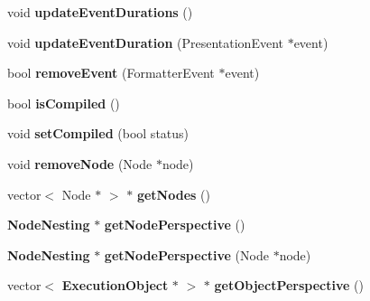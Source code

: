 \begin{CompactItemize}
\item 
void \textbf{updateEventDurations} ()\label{classbr_1_1pucrio_1_1telemidia_1_1ginga_1_1ncl_1_1model_1_1components_1_1ExecutionObject_980cded88f67c552b4515b843b7215be}

\item 
void \textbf{updateEventDuration} (PresentationEvent $\ast$event)\label{classbr_1_1pucrio_1_1telemidia_1_1ginga_1_1ncl_1_1model_1_1components_1_1ExecutionObject_462285fcb61d6a4a79e2f6aeb7413a03}

\item 
bool \textbf{removeEvent} (FormatterEvent $\ast$event)\label{classbr_1_1pucrio_1_1telemidia_1_1ginga_1_1ncl_1_1model_1_1components_1_1ExecutionObject_25223696062ad1dab0c16602db93ac36}

\item 
bool \textbf{isCompiled} ()\label{classbr_1_1pucrio_1_1telemidia_1_1ginga_1_1ncl_1_1model_1_1components_1_1ExecutionObject_bd83d4eca6a60ddc5247e741999c288c}

\item 
void \textbf{setCompiled} (bool status)\label{classbr_1_1pucrio_1_1telemidia_1_1ginga_1_1ncl_1_1model_1_1components_1_1ExecutionObject_607deb200bf05f866ec6fa1d8c21eb3a}

\item 
void \textbf{removeNode} (Node $\ast$node)\label{classbr_1_1pucrio_1_1telemidia_1_1ginga_1_1ncl_1_1model_1_1components_1_1ExecutionObject_f7aa3baee8dcea8617fdc160af52f9cb}

\item 
vector$<$ Node $\ast$ $>$ $\ast$ \textbf{getNodes} ()\label{classbr_1_1pucrio_1_1telemidia_1_1ginga_1_1ncl_1_1model_1_1components_1_1ExecutionObject_45badbe8d5784e8502b16d09ee61b884}

\item 
{\bf NodeNesting} $\ast$ \textbf{getNodePerspective} ()\label{classbr_1_1pucrio_1_1telemidia_1_1ginga_1_1ncl_1_1model_1_1components_1_1ExecutionObject_40612d8e8da3cb166af2762423e3235c}

\item 
{\bf NodeNesting} $\ast$ \textbf{getNodePerspective} (Node $\ast$node)\label{classbr_1_1pucrio_1_1telemidia_1_1ginga_1_1ncl_1_1model_1_1components_1_1ExecutionObject_8d3917403d7d9849e8ae5c1230a34bf8}

\item 
vector$<$ {\bf ExecutionObject} $\ast$ $>$ $\ast$ \textbf{getObjectPerspective} ()\label{classbr_1_1pucrio_1_1telemidia_1_1ginga_1_1ncl_1_1model_1_1components_1_1ExecutionObject_0644e186438caa5a23657d0ef2702fe6}


\end{CompactItemize}
